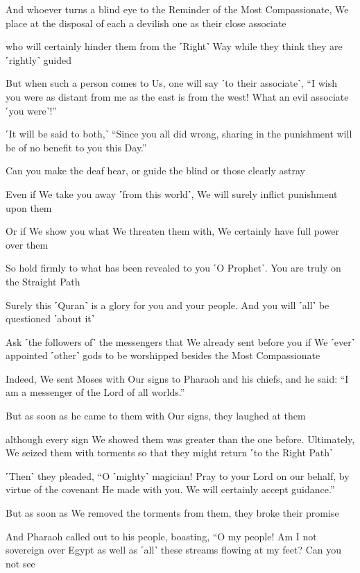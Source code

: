 And whoever turns a blind eye to the Reminder of the Most Compassionate, We place at the disposal of each a devilish one as their close associate

who will certainly hinder them from the ˹Right˺ Way while they think they are ˹rightly˺ guided

But when such a person comes to Us, one will say ˹to their associate˺, “I wish you were as distant from me as the east is from the west! What an evil associate ˹you were˺!”

˹It will be said to both,˺ “Since you all did wrong, sharing in the punishment will be of no benefit to you this Day.”

Can you make the deaf hear, or guide the blind or those clearly astray

Even if We take you away ˹from this world˺, We will surely inflict punishment upon them

Or if We show you what We threaten them with, We certainly have full power over them

So hold firmly to what has been revealed to you ˹O Prophet˺. You are truly on the Straight Path

Surely this ˹Quran˺ is a glory for you and your people. And you will ˹all˺ be questioned ˹about it˺

Ask ˹the followers of˺ the messengers that We already sent before you if We ˹ever˺ appointed ˹other˺ gods to be worshipped besides the Most Compassionate

Indeed, We sent Moses with Our signs to Pharaoh and his chiefs, and he said: “I am a messenger of the Lord of all worlds.”

But as soon as he came to them with Our signs, they laughed at them

although every sign We showed them was greater than the one before. Ultimately, We seized them with torments so that they might return ˹to the Right Path˺

˹Then˺ they pleaded, “O ˹mighty˺ magician! Pray to your Lord on our behalf, by virtue of the covenant He made with you. We will certainly accept guidance.”

But as soon as We removed the torments from them, they broke their promise

And Pharaoh called out to his people, boasting, “O my people! Am I not sovereign over Egypt as well as ˹all˺ these streams flowing at my feet? Can you not see

